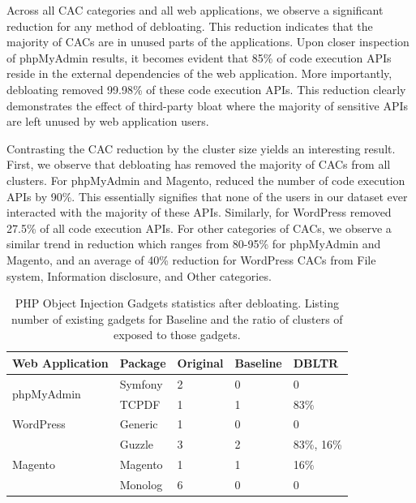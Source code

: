Across all CAC categories and all web applications, we observe a significant reduction for any method of debloating. 
This reduction indicates that the majority of CACs are in unused parts of the applications. Upon closer inspection of phpMyAdmin results, it becomes evident that 85\% of code execution APIs reside in the external dependencies of the web application. 
More importantly, debloating removed 99.98\% of these code execution APIs. 
This reduction clearly demonstrates the effect of third-party bloat where the majority of sensitive APIs are left unused by web application users. 

Contrasting the CAC reduction by the cluster size yields an interesting result. 
First, we observe that debloating has removed the majority of CACs from all clusters. 
For phpMyAdmin and Magento, \dbltr{} reduced the number of code execution APIs by 90\%. 
This essentially signifies that none of the users in our dataset ever interacted with the majority of these APIs. 
Similarly, for WordPress \dbltr{} removed 27.5\% of all code execution APIs. 
For other categories of CACs, we observe a similar trend in reduction which ranges from 80-95\% for phpMyAdmin and Magento, and an average of 40\% reduction for WordPress CACs from File system, Information disclosure, and Other categories. 

\begin{table}[]
    \centering
    \caption{PHP Object Injection Gadgets statistics after debloating. Listing number of existing gadgets for Baseline and the ratio of clusters of \dbltr{} exposed to those gadgets.}
    \label{tab:poi_gadgets}
    \begin{tabular}{|l|l|l|l|l|}
        \hline
        Web Application             & Package & Original & Baseline & DBLTR \\ \hline
        \multirow{2}{*}{phpMyAdmin} & Symfony & 2        & 0        & 0     \\ \cline{2-5} 
                                    & TCPDF   & 1        & 1        & 83\%  \\ \hline
        WordPress                   & Generic & 1        & 0        & 0     \\ \hline
        \multirow{3}{*}{Magento}    & Guzzle  & 3        & 2        & 83\%, 16\% \\ \cline{2-5} 
                                    & Magento & 1        & 1        & 16\%  \\ \cline{2-5} 
                                    & Monolog & 6        & 0        & 0     \\ \hline
        \end{tabular}
\end{table}

